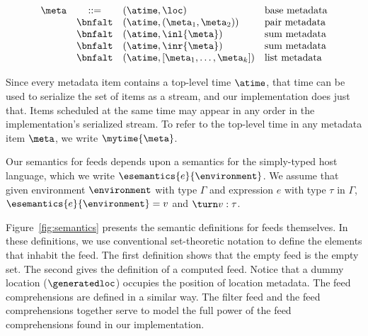 \[
\begin{array}{lcll} 
\meta & ::=     
& (\atime,\loc) & \mbox{base metadata} \\
& \bnfalt & (\atime,(\meta_1,\meta_2)) & \mbox{pair metadata} \\
& \bnfalt & (\atime,\inl{\meta}) & \mbox{sum metadata} \\
& \bnfalt & (\atime,\inr{\meta}) & \mbox{sum metadata} \\
& \bnfalt & (\atime,[\meta_1,\ldots,\meta_k]) & \mbox{list metadata} \\
\end{array}
\]  

Since every metadata item contains a top-level time $\atime$, that
time can be used to serialize the set of items as a stream, and 
our implementation does just that.  Items scheduled at the
same time may appear in any order in the implementation's
serialized stream.  To refer to the top-level time in any metadata
item $\meta$, we write $\mytime{\meta}$. 

Our semantics for feeds depends upon a semantics for the simply-typed
host language, which we write $\esemantics{e}{\environment}$. We assume that
given environment $\environment$ with type $\Gamma$ 
and expression $e$ with type $\tau$ in $\Gamma$, 
$\esemantics{e}{\environment} = v$
and $\turn v : \tau$.

Figure~\ref{fig:semantics} presents the semantic definitions for feeds themselves.  In these definitions,
we use conventional set-theoretic notation to define the elements
that inhabit the feed.
The first definition shows that the empty feed is the empty set. The
second gives the definition of a computed feed.  Notice that a
dummy location ($\generatedloc$) occupies the position of location
metadata.  The feed comprehensions are defined in a similar way. 
The filter feed and the feed comprehensions together serve to model
the full power of the feed comprehensions found in our implementation.


